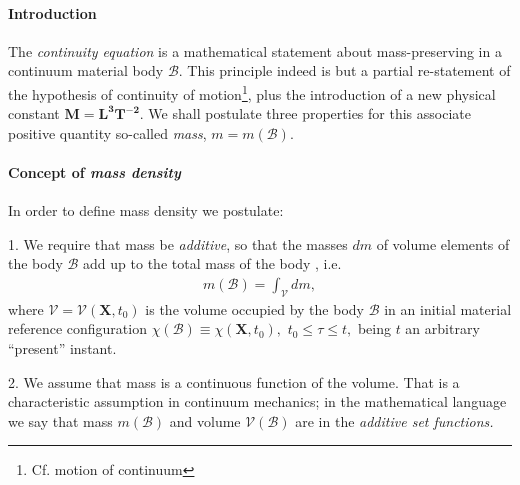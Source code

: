 \documentclass[12pt]{article}
\begin{document}
\paragraph{Introduction}
The {\em continuity equation}\cite{cite:Euler1} is a mathematical statement about mass-preserving in a continuum material body $\mathscr{B}$. This principle indeed is but a partial re-statement of the hypothesis of continuity of motion{\footnote{Cf. motion of continuum}}, plus the introduction of a new physical constant $\mathrm{\mathbf{M=L^3T^{-2}}}$. We shall postulate three properties for this associate positive quantity so-called {\em mass},
$m=m(\mathscr{B})$.
\paragraph{Concept of {\em mass density}}
In order to define mass density we postulate:

1. We require that mass be {\em additive}, so that the masses $dm$ of volume elements of the body $\mathscr{B}$ add up to the total mass of the body , i.e.
\begin{align*}
m(\mathscr{B})=\int_{\mathscr{V}}dm,
\end{align*}
where $\mathscr{V}=\mathscr{V}(\mathbf{X},t_0)$ is the volume occupied by the body $\mathscr{B}$ in an initial material reference configuration 
$\chi(\mathscr{B})\equiv\chi (\mathbf{X},t_0),$ $t_0\leq\tau\leq{t},$ being $t$  an arbitrary ``present'' instant. 

2. We assume that mass is a continuous function of the volume. That is a characteristic assumption in continuum mechanics; in the mathematical language we say that mass $m(\mathscr{B})$ and volume $\mathscr{V}(\mathscr{B})$ are in the {\em additive set functions.}
\end{document}
